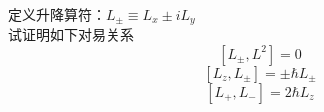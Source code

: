 \begin{frame} [allowframebreaks=]
    \frametitle{}
    \begin{tcolorbox}[colback=yellow!5,colframe=yellow!75!black,title=课堂作业]
        定义升降算符：$L_\pm \equiv L_x \pm i L_y$ \\
     试证明如下对易关系  $$[L_\pm,L^2]=0$$
     $$[L_z, L_\pm]= \pm \hbar L_\pm $$
     $$[L_+, L_-]= 2 \hbar L_z $$
    \end{tcolorbox}
\end{frame} 
